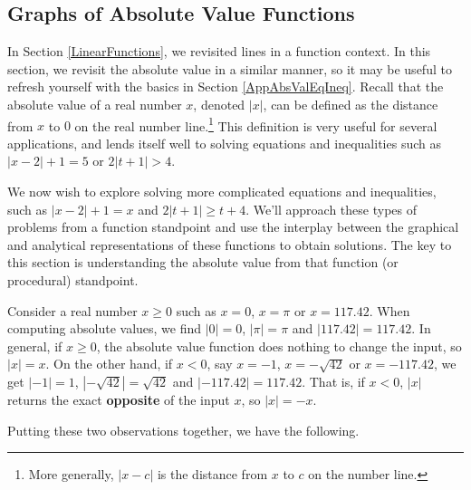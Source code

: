 \documentclass{ximera}
\begin{document}
	\author{Stitz-Zeager}




\setcounter{footnote}{0}

\label{AbsoluteValueFunctions}

\subsection{Graphs of Absolute Value Functions}
\label{GraphsofAbsoluteValueFunctions}

In Section \ref{LinearFunctions}, we revisited lines in a function context.  In this section, we revisit the absolute value in a similar manner, so it may be useful to refresh yourself with the basics in Section \ref{AppAbsValEqIneq}. Recall that the absolute value of a real number $x$, denoted $|x|$, can be  defined as the distance from $x$ to $0$ on the real number line.\footnote{More generally, $|x - c|$ is the distance from $x$ to $c$ on the number line.}  This definition is very useful for several applications, and lends itself well to solving equations and inequalities such as $|x - 2| + 1 = 5$ or $2|t + 1| > 4$.  

\medskip

We now wish to explore solving more complicated equations and inequalities, such as $|x - 2| + 1 = x$ and $2|t + 1| \geq t + 4$. We'll approach these types of problems from a function standpoint and use the interplay between the graphical and analytical representations of these functions to obtain solutions. The key to this section is understanding the absolute value from that function (or procedural) standpoint. 

\medskip

Consider a real number $x \geq 0$ such as $x = 0$, $x = \pi$ or $x = 117.42$.  When computing absolute values, we find $|0| = 0$, $|\pi| = \pi$ and $|117.42| = 117.42$.  In general,  if $x \geq 0$, the absolute value function does nothing to change the input, so $|x| = x$. On the other hand, if $x < 0$, say $x = -1$, $x = -\sqrt{42}$ or $x = -117.42$, we get $|-1| = 1$, $|-\sqrt{42}| = \sqrt{42}$ and $|-117.42| = 117.42$.  That is, if $x < 0$, $|x|$ returns the exact \textbf{opposite} of the input $x$, so  $|x| = -x$.  

\medskip

Putting these two observations together, we have the following.
\end{document}
